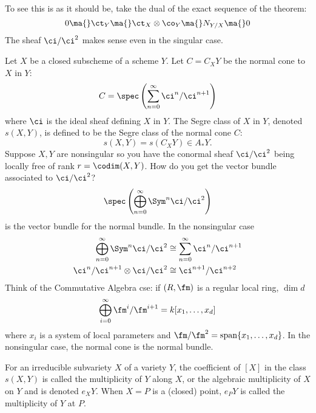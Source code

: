 To see this is as it should be, take the dual of the exact sequence of the theorem:
	\[
	0 \ma{} \ct_Y \ma{} \ct_X \otimes \co_Y \ma{} N_{Y/X} \ma{} 0
	\]
The sheaf $\ci/\ci^2$ makes sense even in the singular case.


Let $X$ be a closed subscheme of a scheme $Y$. Let $C=C_XY$ be the normal cone to $X$ in $Y$:
	\[
	C=\spec\left(\sum_{n=0}^\infty \ci^n/\ci^{n+1}\right)
	\]
where $\ci$ is the ideal sheaf defining $X$ in $Y$. The Segre class of $X$ in $Y$, denoted $s(X,Y)$, is defined to be the Segre class of the normal cone $C$:
	\[
	s(X,Y)=s(C_XY) \in A_*Y.
	\]
Suppose $X,Y$ are nonsingular so you have the conormal sheaf $\ci/\ci^2$ being locally free of rank $r=\codim(X,Y)$. How do you get the vector bundle associated to $\ci/\ci^2$?
	\[
	\spec\left(\bigoplus_{n=0}^\infty \Sym^n \ci/\ci^2\right)
	\]
is the vector bundle for the normal bundle. In the nonsingular case
	\[
	\begin{split}
	\bigoplus_{n=0}^\infty \Sym^n \ci/\ci^2 &\cong \sum_{n=0}^\infty \ci^n/\ci^{n+1} \\
	\ci^n/\ci^{n+1} \otimes \ci/\ci^2 &\cong \ci^{n+1}/\ci^{n+2}
	\end{split}
	\]
Think of the Commutative Algebra cse: if $(R,\fm)$ is a regular local ring, $\dim d$
	\[
	\bigoplus_{i=0}^\infty \fm^i/\fm^{i+1}= k[x_1,\ldots,x_d]
	\]
where $x_i$ is a system of local parameters and $\fm/\fm^2=\text{span}\{x_1,\ldots,x_d\}$. In the nonsingular case, the normal cone is the normal bundle. 

\begin{dfn}
For an irreducible subvariety $X$ of a variety $Y$, the coefficient of $[X]$ in the class $s(X,Y)$ is called the multiplicity of $Y$ along $X$, or the algebraic multiplicity of $X$ on $Y$ and is denoted $e_XY$. When $X=P$ is a (closed) point, $e_PY$ is called the multiplicity of $Y$ at $P$.
\end{dfn}

